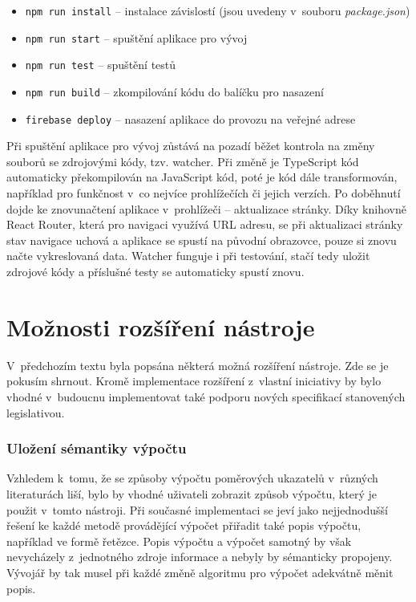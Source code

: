 \begin{itemize}
  \item \texttt{npm run install} -- instalace závislostí (jsou uvedeny v~souboru \textit{package.json})
  \item \texttt{npm run start} -- spuštění aplikace pro vývoj
  \item \texttt{npm run test} -- spuštění testů
  \item \texttt{npm run build} -- zkompilování kódu do balíčku pro nasazení
  \item \texttt{firebase deploy} -- nasazení aplikace do provozu na veřejné adrese
\end{itemize}

Při spuštění aplikace pro vývoj zůstává na pozadí běžet kontrola na změny souborů se zdrojovými kódy, tzv. watcher. Při změně je TypeScript kód automaticky překompilován na JavaScript kód, poté je kód dále transformován, například pro funkčnost v~co nejvíce prohlížečích či jejich verzích. Po doběhnutí dojde ke znovunačtení aplikace v~prohlížeči -- aktualizace stránky. Díky knihovně React Router, která pro navigaci využívá URL adresu, se při aktualizaci stránky stav navigace uchová a aplikace se spustí na původní obrazovce, pouze si znovu načte vykreslovaná data. Watcher funguje i při testování, stačí tedy uložit zdrojové kódy a příslušné testy se automaticky spustí znovu.


\section{Možnosti rozšíření nástroje}
V~předchozím textu byla popsána některá možná rozšíření nástroje. Zde se je pokusím shrnout. Kromě implementace rozšíření z~vlastní iniciativy by bylo vhodné v~budoucnu implementovat také podporu nových specifikací stanovených legislativou. 

\subsubsection{Uložení sémantiky výpočtu}
Vzhledem k~tomu, že se způsoby výpočtu poměrových ukazatelů v~různých literaturách liší, bylo by vhodné uživateli zobrazit způsob výpočtu, který je použit v~tomto nástroji. Při současné implementaci se jeví jako nejjednodušší řešení ke každé metodě provádějící výpočet přiřadit také popis výpočtu, například ve formě řetězce. Popis výpočtu a výpočet samotný by však nevycházely z~jednotného zdroje informace a nebyly by sémanticky propojeny. Vývojář by tak musel při každé změně algoritmu pro výpočet adekvátně měnit popis. 

